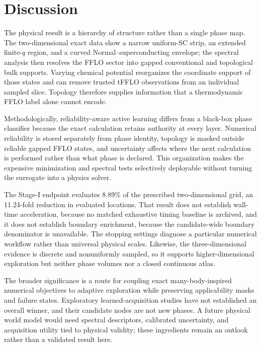 \section{Discussion}
The physical result is a hierarchy of structure rather than a single phase map.  The two-dimensional exact data show a narrow uniform-SC strip, an extended finite-$q$ region, and a curved Normal--superconducting envelope; the spectral analysis then resolves the FFLO sector into gapped conventional and topological bulk supports.  Varying chemical potential reorganizes the coordinate support of those states and can remove trusted tFFLO observations from an individual sampled slice.  Topology therefore supplies information that a thermodynamic FFLO label alone cannot encode.

Methodologically, reliability-aware active learning differs from a black-box phase classifier because the exact calculation retains authority at every layer.  Numerical reliability is stored separately from phase identity, topology is masked outside reliable gapped FFLO states, and uncertainty affects where the next calculation is performed rather than what phase is declared.  This organization makes the expensive minimization and spectral tests selectively deployable without turning the surrogate into a physics solver.

The Stage-I endpoint evaluates 8.89\% of the prescribed two-dimensional grid, an 11.24-fold reduction in evaluated locations.  That result does not establish wall-time acceleration, because no matched exhaustive timing baseline is archived, and it does not establish boundary enrichment, because the candidate-wide boundary denominator is unavailable.  The stopping settings diagnose a particular numerical workflow rather than universal physical scales.  Likewise, the three-dimensional evidence is discrete and nonuniformly sampled, so it supports higher-dimensional exploration but neither phase volumes nor a closed continuous atlas.

The broader significance is a route for coupling exact many-body-inspired numerical objectives to adaptive exploration while preserving applicability masks and failure states.  Exploratory learned-acquisition studies have not established an overall winner, and their candidate nodes are not new phases.  A future physical world model would need spectral descriptors, calibrated uncertainty, and acquisition utility tied to physical validity; these ingredients remain an outlook rather than a validated result here.
